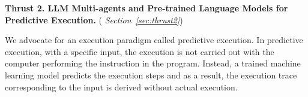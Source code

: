 




\vspace{3pt}
\noindent \textbf{Thrust 2. LLM Multi-agents and Pre-trained
  Language Models for Predictive Execution.}  ({\em
  Section~\ref{sec:thrust2}})

We advocate for an execution paradigm called predictive execution. In
predictive execution, with a specific input, the execution is not
carried out with the computer performing the instruction in the
program. Instead, a trained machine learning model predicts the
execution steps and as a result, the execution trace corresponding to
the input is derived without actual execution.

